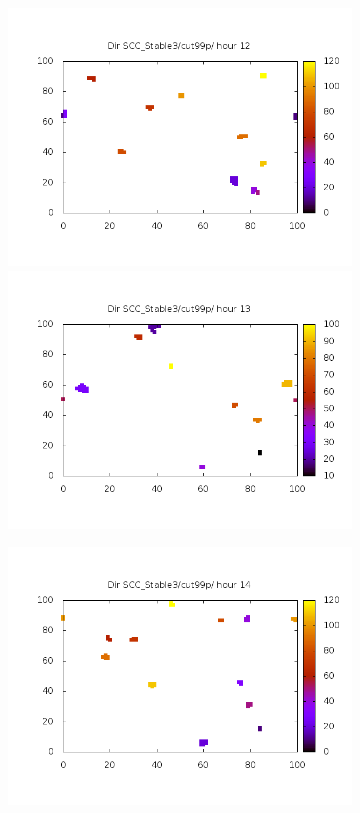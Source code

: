 \documentclass[10pt,a4paper]{article}
\begin{document}
\begin{figure}
\centering

\begin{subfigure}[b]{1\textwidth}
\includegraphics[scale=.4]{./img/SCC_Stable3/cut99p/12.png}
\includegraphics[scale=.4]{./img/SCC_Stable3/cut99p/13.png}
\end{subfigure}
\begin{subfigure}[b]{1\textwidth}
\includegraphics[scale=.4]{./img/SCC_Stable3/cut99p/14.png}

\end{subfigure}
\end{figure}
\end{document}
